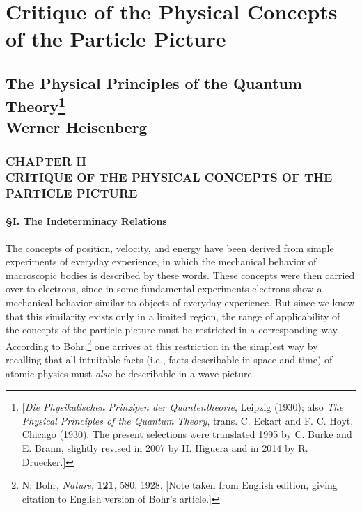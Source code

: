 \chapter{Critique of the Physical Concepts of the Particle Picture}


\renewcommand{\theequation}{\arabic{equation}}



\section*{The Physical Principles of the Quantum Theory\footnote{{[}\emph{Die
  Physikalischen Prinzipen der Quantentheorie}, Leipzig (1930); also
  \emph{The Physical Principles of the Quantum Theory}, trans. C. Eckart
  and F. C. Hoyt, Chicago (1930). The present selections were translated
  1995 by C. Burke and E. Brann, slightly revised in 2007 by H. Higuera
  and in 2014 by R. Druecker.{]}}\\
  {\large Werner Heisenberg}}

\subsection*{CHAPTER II\\
CRITIQUE OF THE PHYSICAL CONCEPTS OF THE PARTICLE PICTURE}

\subsubsection*{§I. The Indeterminacy Relations}

The concepts of position, velocity, and energy have been derived from
simple experiments of everyday experience, in which the mechanical
behavior of macroscopic bodies is described by these words. These
concepts were then carried over to electrons, since in some fundamental
experiments electrons show a mechanical behavior similar to objects of
everyday experience. But since we know that this similarity exists only
in a limited region, the range of applicability of the concepts of the
particle picture must be restricted in a corresponding way. According to
Bohr,\footnote{N. Bohr, \emph{Nature}, \textbf{121}, 580, 1928. {[}Note taken
  from English edition, giving citation to English version of Bohr's
  article.{]}} one arrives at this restriction in the simplest way by
recalling that all intuitable facts (i.e., facts describable in space
and time) of atomic physics must \emph{also} be describable in a wave
picture.

